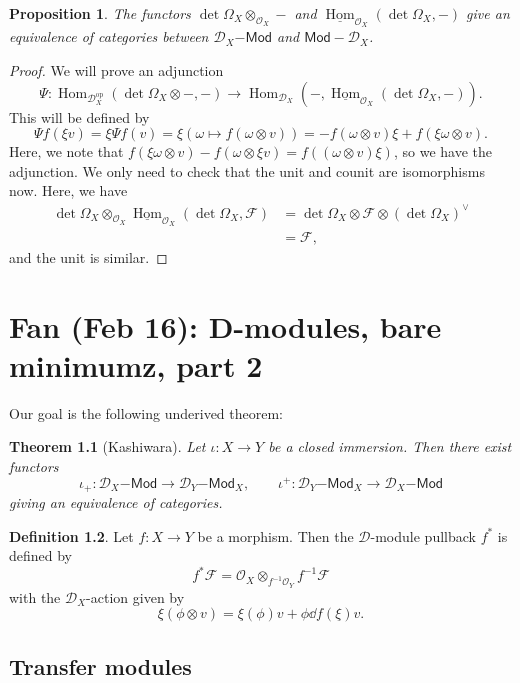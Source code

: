 \documentclass[leqno, openany]{memoir}
\newtheorem{thm}{Theorem}[section]
\newtheorem{prop}[thm]{Proposition}
\theoremstyle{definition}
\newtheorem{defn}[thm]{Definition}
\theoremstyle{remark}
\theoremstyle{plain}
\theoremstyle{definition}
\theoremstyle{remark}
\newcommand{\mc}[1]{\mathcal{#1}}
\newcommand{\mr}[1]{\mathrm{#1}}
\newcommand{\ms}[1]{\mathsf{#1}}
\newcommand{\ul}[1]{\underline{#1}}
\DeclareMathOperator{\Hom}{Hom}
\begin{document}
\begin{prop}
    The functors $\det \Omega_X \otimes_{\mc{O}_X} -$ and $\ul{\Hom}_{\mc{O}_X}(\det \Omega_X, -)$ give an equivalence of categories between $\mc{D}_X\ms{-Mod}$ and $\ms{Mod-}\mc{D}_X$.
\end{prop}

\begin{proof}
    We will prove an adjunction
    \[ \Psi \colon \Hom_{\mc{D}_X^{\mr{op}}} (\det \Omega_X \otimes -, -) \to \Hom_{\mc{D}_X}(-, \ul{\Hom}_{\mc{O}_X}(\det \Omega_X, -)). \]
    This will be defined by
    \[ \Psi f(\xi v) = \xi \Psi f(v) = \xi(\omega \mapsto f(\omega \otimes v)) = - f(\omega \otimes v) \xi + f(\xi \omega \otimes v). \]
    Here, we note that $f(\xi \omega \otimes v) - f(\omega \otimes \xi v) = f((\omega \otimes v) \xi)$, so we have the adjunction. We only need to check that the unit and counit are isomorphisms now. Here, we have
    \begin{align*}
        \det \Omega_X \otimes_{\mc{O}_X} \ul{\Hom}_{\mc{O}_X}(\det \Omega_X, \mc{F}) &= \det \Omega_X \otimes \mc{F} \otimes (\det \Omega_X)^{\vee} \\
        &= \mc{F},
    \end{align*}
    and the unit is similar.
\end{proof}

\chapter{Fan (Feb 16): D-modules, bare minimumz, part 2}%

Our goal is the following underived theorem:
\begin{thm}[Kashiwara]
    Let $\iota \colon X \to Y$ be a closed immersion. Then there exist functors
    \[\iota_+ \colon \mc{D}_X\ms{-Mod} \to \mc{D}_Y\ms{-Mod}_X, \qquad \iota^+ \colon \mc{D}_Y\ms{-Mod}_X \to \mc{D}_X\ms{-Mod} \] 
    giving an equivalence of categories.
\end{thm}

\begin{defn}
    Let $f \colon X \to Y$ be a morphism. Then the $\mc{D}$-module pullback $f^*$ is defined by
    \[ f^* \mc{F} = \mc{O}_X \otimes_{f^{-1} \mc{O}_Y} f^{-1} \mc{F} \]
    with the $\mc{D}_X$-action given by 
    \[ \xi(\phi \otimes v) = \xi(\phi) v + \phi \dd{f}(\xi) v. \]
\end{defn}

\section{Transfer modules}
\end{document}
